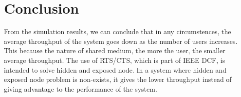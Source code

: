 \chapter{Conclusion}

From the simulation results, we can conclude that in any circumstences, the average throughput of the system goes down as the number of users increases. This because the nature of shared medium, the more the user, the smaller average throughput. The use of RTS/CTS, which is part of IEEE DCF, is intended to solve hidden and exposed node. In a system where hidden and exposed node problem is non-exists, it gives the lower throughput instead of giving advantage to the performance of the system.